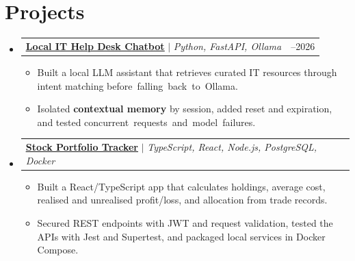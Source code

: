 \documentclass[letterpaper,11pt]{article}
\makeatletter
\newcommand{\resumeBodyFont}{
  \fontsize{10.2pt}{11.2pt}\selectfont
}
\newcommand{\resumeItem}[1]{
  \item{\resumeBodyFont #1}
}
\newcommand{\resumeProjectHeading}[2]{
  \item
    \begin{tabularx}{\textwidth}[t]
      {@{}>{\raggedright\arraybackslash}Xr@{}}
      \resumeBodyFont #1 & \resumeBodyFont #2 \\
    \end{tabularx}
    \vspace{-9pt}
}
\newcommand{\resumeSubHeadingListStart}{
  \begin{itemize}[
    leftmargin=0in,
    label={},
    itemsep=7pt,
    topsep=1pt,
    parsep=0pt,
    partopsep=0pt
  ]
}
\newcommand{\resumeSubHeadingListEnd}{
  \end{itemize}
  \vspace{-3pt}
}
\newcommand{\resumeItemListStart}{
  \vspace{-2pt}
  \begin{itemize}[
    leftmargin=0.25in,
    itemsep=4pt,
    topsep=0pt,
    parsep=0pt,
    partopsep=0pt
  ]
}
\newcommand{\resumeItemListEnd}{
  \end{itemize}
  \vspace{-3pt}
}
\makeatother
\begin{document}
\section{Projects}
\resumeSubHeadingListStart
\resumeProjectHeading{\href{https://github.com/YashRoushan/localchatbot}{\textbf{\underline{Local IT Help Desk Chatbot}}} $|$ \emph{Python, FastAPI, Ollama}}{2025--2026}
\resumeItemListStart
  \resumeItem{Built a local LLM assistant that retrieves curated IT resources through intent matching \mbox{before falling back to Ollama.}}
  \resumeItem{Isolated \textbf{contextual memory} by session, added reset and expiration, and tested \mbox{concurrent requests and model failures.}}
\resumeItemListEnd
\resumeProjectHeading{\href{https://github.com/YashRoushan/Stock-Portfolio-Tracker}{\textbf{\underline{Stock Portfolio Tracker}}} $|$ \emph{TypeScript, React, Node.js, PostgreSQL, Docker}}{2026}
\resumeItemListStart
  \resumeItem{Built a React/TypeScript app that calculates holdings, average cost, realised and unrealised profit/loss, and allocation from trade records.}
  \resumeItem{Secured REST endpoints with JWT and request validation, tested the APIs with Jest and Supertest, and packaged local services in Docker Compose.}
\resumeItemListEnd
\resumeSubHeadingListEnd
\end{document}
